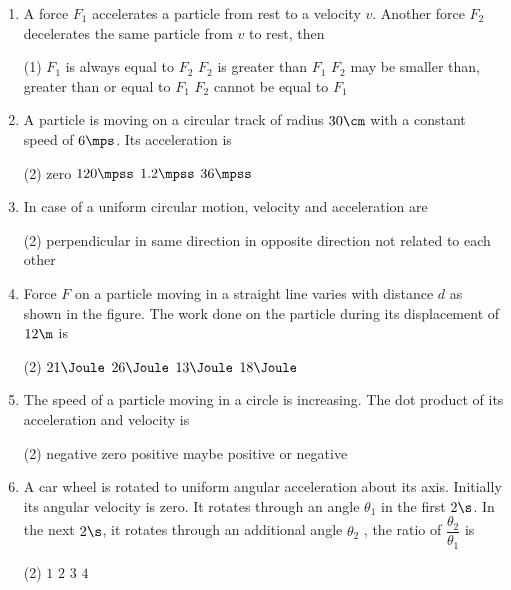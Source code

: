 \documentclass{article}
\begin{document}
\begin{enumerate}
\item A force $F_1$ accelerates a particle from rest to a velocity $v$. Another force $F_2$ decelerates the same particle from $v$ to rest, then
\begin{tasks}(1)
	\task $F_1$ is always equal to $F_2$\ans
	\task $F_2$ is greater than $F_1$
	\task $F_2$ may be smaller than, greater than or equal to $F_1$
	\task $F_2$ cannot be equal to $F_1$
\end{tasks}


\item A particle is moving on a circular track of radius $30 \cm$ with a constant speed of $6 \mps$. Its acceleration is
\begin{tasks}(2)
	\task zero
	\task $120\mpss$\ans
	\task $1.2\mpss$
	\task $36\mpss$
\end{tasks}

\item In case of a uniform circular motion, velocity and acceleration are
\begin{tasks}(2)
	\task perpendicular\ans
	\task in same direction
	\task in opposite direction
	\task not related to each other
\end{tasks}

\item Force $F$ on a particle moving in a straight line varies with distance $d$ as shown in the figure. The work done on the particle during its displacement of $12\m$ is
\begin{center}
\end{center}
\begin{tasks}(2)
	\task $21\Joule$
	\task $26\Joule$
	\task $13\Joule$\ans
	\task $18\Joule$
\end{tasks}

\item The speed of a particle moving in a circle is increasing. The dot product of its acceleration and velocity is
\begin{tasks}(2)
	\task negative
	\task zero
	\task positive\ans
	\task maybe positive or negative
\end{tasks}

\item A car wheel is rotated to uniform angular acceleration about its axis. Initially its angular velocity is zero. It rotates through an angle $\theta_1$ in the first $2 \s$. In the next $2 \s$, it rotates through an additional angle $\theta_2$ , the ratio of $\dfrac{\theta_2}{\theta_1}$ is
\begin{tasks}(2)
	\task $1$
	\task $2$
	\task $3$\ans
	\task $4$
\end{tasks}


\end{enumerate}
\end{document}
